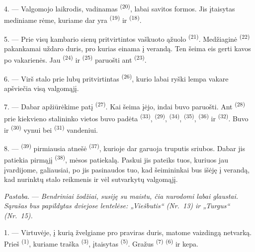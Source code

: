 4. --- Valgomojo laikrodis, vadinamas 
\textsuperscript{(20)}, labai savitos formos. Jis įtaisytas mediniame rėme, kuriame
dar yra  \textsuperscript{(19)} ir 
\textsuperscript{(18)}.

\VUsaut{4.6mm}
\VUsaut{3.0mm}

5. --- Prie visų kambario sienų pritvirtintos vaškuoto ąžuolo  \textsuperscript{(21)}. Medžiaginė 
\textsuperscript{(22)} pakankamai uždaro duris, pro kurias einama į verandą. Ten
šeima eis gerti kavos po vakarienės. Jau  \textsuperscript{(24)} ir
 \textsuperscript{(25)} paruošti ant 
\textsuperscript{(23)}.

6. --- Virš stalo prie lubų pritvirtintas 
\textsuperscript{(26)}, kurio labai ryški lempa vakare apšviečia visą valgomąjį.

7. --- Dabar apžiūrėkime patį  \textsuperscript{(27)}. Kai
šeima įėjo, indai buvo paruošti. Ant  \textsuperscript{(28)} prie
kiekvieno stalininko vietos buvo padėta  \textsuperscript{(33)},
 \textsuperscript{(29)},  \textsuperscript{(34)},
 \textsuperscript{(35)},  \textsuperscript{(36)} ir
 \textsuperscript{(32)}. Buvo ir 
\textsuperscript{(30)} vynui bei  \textsuperscript{(31)} vandeniui.

8. ---  \textsuperscript{(39)} pirmiausia atnešė 
\textsuperscript{(37)}, kurioje dar garuoja truputis sriubos. Dabar jis patiekia
pirmąjį  \textsuperscript{(38)}, mėsos patiekalą. Paskui jis
pateiks tuos, kuriuos jau įvardijome, galiausiai, po  jis
pasinaudos tuo, kad šeimininkai bus išėję į verandą, kad nurinktų stalo reikmenis ir
vėl sutvarkytų valgomąjį.

\textit{Pastaba.} --- \textit{Bendriniai žodžiai, susiję su maistu, čia nurodomi labai
glaustai. Sąrašas bus papildytas dviejose lentelėse: „Viešbutis“ (Nr.~13) ir
„Turgus“ (Nr.~15).}

\VUsaut{4.6mm}
\VUsaut{3.0mm}

1. --- Virtuvėje, į kurią žvelgiame pro praviras duris, matome vaizdingą netvarką.
Prieš  \textsuperscript{(1)}, kuriame traška 
\textsuperscript{(3)}, įtaisytas  \textsuperscript{(5)}. Gražus
 \textsuperscript{(7)} 
\textsuperscript{(6)} ir kepa.


